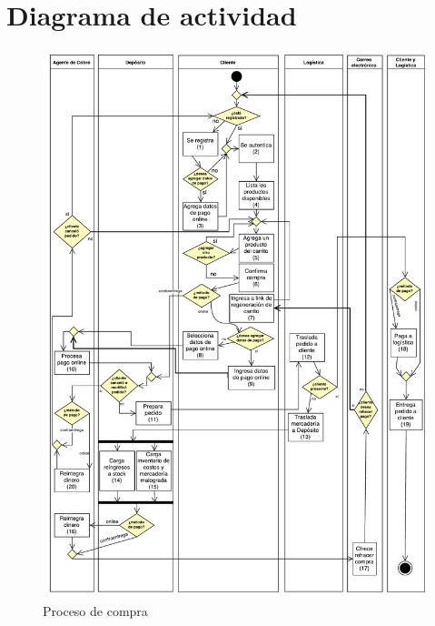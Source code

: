 \section{Diagrama de actividad}

\begin{figure}[H]
  \begin{center}
  \includegraphics[width=\textwidth]{tp2/images/actividad-compra.pdf}
  \end{center}
  \caption{Proceso de compra}
\end{figure}

